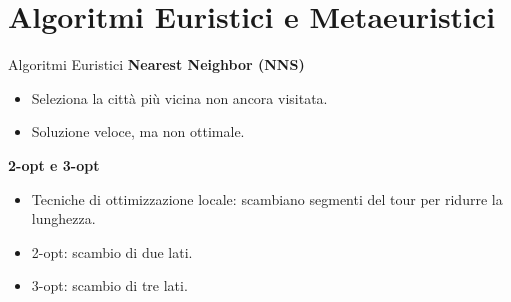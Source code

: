 \documentclass{beamer}
\begin{document}
\section{Algoritmi Euristici e Metaeuristici}
\begin{frame}{Algoritmi Euristici}
    \textbf{Nearest Neighbor (NNS)}
    \begin{itemize}
        \item Seleziona la città più vicina non ancora visitata.
        \item Soluzione veloce, ma non ottimale.
    \end{itemize}
    \textbf{2-opt e 3-opt}
    \begin{itemize}
        \item Tecniche di ottimizzazione locale: scambiano segmenti del tour per ridurre la lunghezza.
        \item 2-opt: scambio di due lati.
        \item 3-opt: scambio di tre lati.
    \end{itemize}



\end{frame}
\end{document}

